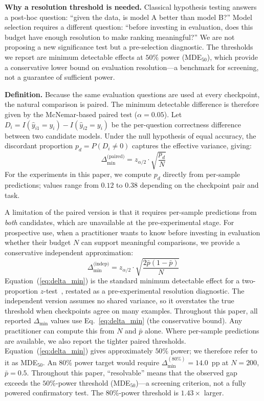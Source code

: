 \documentclass[pdflatex,sn-mathphys-ay,oneside]{sn-jnl}
\theoremstyle{thmstylethree}
\begin{document}
\noindent\textbf{Why a resolution threshold is needed.} Classical hypothesis testing answers a post-hoc question: ``given the data, is model A better than model B?'' Model selection requires a different question: ``before investing in evaluation, does this budget have enough resolution to make ranking meaningful?'' We are not proposing a new significance test but a pre-selection diagnostic. The thresholds we report are minimum detectable effects at $50\%$ power (MDE$_{50}$), which provide a conservative lower bound on evaluation resolution---a benchmark for screening, not a guarantee of sufficient power.

\noindent\textbf{Definition.} Because the same evaluation questions are used at every checkpoint, the natural comparison is paired. The minimum detectable difference is therefore given by the McNemar-based paired test ($\alpha=0.05$). Let $D_i = I(\hat y_{i1}=y_i) - I(\hat y_{i2}=y_i)$ be the per-question correctness difference between two candidate models. Under the null hypothesis of equal accuracy, the discordant proportion $p_d = P(D_i \neq 0)$ captures the effective variance, giving:
\begin{equation}
\Delta_{\min}^{\text{(paired)}} = z_{\alpha/2} \cdot \sqrt{\frac{p_d}{N}}
\label{eq:delta_min_paired}
\end{equation}
For the experiments in this paper, we compute $p_d$ directly from per-sample predictions; values range from $0.12$ to $0.38$ depending on the checkpoint pair and task.

A limitation of the paired version is that it requires per-sample predictions from \emph{both} candidates, which are unavailable at the pre-experimental stage. For prospective use, when a practitioner wants to know before investing in evaluation whether their budget $N$ can support meaningful comparisons, we provide a conservative independent approximation:
\begin{equation}
\Delta_{\min}^{\text{(indep)}} = z_{\alpha/2} \cdot \sqrt{ \frac{2 \bar{p} (1 - \bar{p})}{N} }
\label{eq:delta_min}
\end{equation}
Equation~(\ref{eq:delta_min}) is the standard minimum detectable effect for a two-proportion $z$-test~\citep{cohen1988statistical}, restated as a pre-experimental resolution diagnostic. The independent version assumes no shared variance, so it overstates the true threshold when checkpoints agree on many examples. Throughout this paper, all reported $\Delta_{\min}$ values use Eq.~\eqref{eq:delta_min} (the conservative bound). Any practitioner can compute this from $N$ and $\bar{p}$ alone. Where per-sample predictions are available, we also report the tighter paired thresholds. Equation~(\ref{eq:delta_min}) gives approximately $50\%$ power; we therefore refer to it as MDE$_{50}$. An $80\%$ power target would require $\Delta_{\min}^{(80\%)}=14.0$~pp at $N=200$, $\bar{p}=0.5$. Throughout this paper, ``resolvable'' means that the observed gap exceeds the $50\%$-power threshold (MDE$_{50}$)---a screening criterion, not a fully powered confirmatory test. The $80\%$-power threshold is $1.43\times$ larger.
\end{document}
